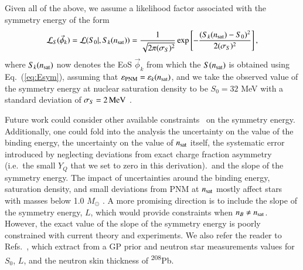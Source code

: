 \documentclass[aps,prd,nofootinbib,tightenlines,notitlepage,floatfix,superscriptaddress,showkeys,twocolumn]{revtex4-1}
\newcommand{\MeV}{\, {\rm MeV}}
\begin{document}
Given all of the above, we assume a likelihood factor associated with the symmetry energy of the form 
\begin{equation}
    \mathcal{L}_S(\vec{\phi}_k) = \mathcal{L}(S_0 |, S_k (n_{\rm sat})) = \dfrac{1}{\sqrt{2\pi(\sigma_S)^2}}\exp\left[-{\dfrac{( S_k(n_{\rm sat}) - S_0)^2}{2(\sigma_S)^2}}\right],
\end{equation}
where $S_k(n_{\rm sat})$ now denotes the EoS $\vec{\phi}_k$ from which the $S(n_{\rm sat})$ is obtained using Eq.~(\ref{eq:Esym}), assuming that $\varepsilon_{\rm PNM} = \varepsilon_k(n_{\rm sat})$, and we take the observed value of the symmetry energy at nuclear saturation density to be $S_0 = 32$ MeV with a standard deviation of $\sigma_S = 2 \MeV$ \cite{Tsang:2012se,Li:2019xxz}. 

Future work could consider other available constraints~\cite{Li:2019xxz,Drischler:2020hwi} on the symmetry energy. Additionally, one could fold into the analysis the uncertainty on the value of the binding energy, the uncertainty on the value of $n_{\rm sat}$ itself, the systematic error introduced by neglecting deviations from exact charge fraction asymmetry (i.e.~the small $Y_Q$ that we set to zero in this derivation).\, and the slope of the symmetry energy. The impact of uncertainties around the binding energy, saturation density, and small deviations from PNM at $n_{\rm sat}$ mostly affect stars with masses below 1.0 $M_\odot$ \cite{Miller:2019nzo}. A more promising direction is to include the slope of the symmetry energy, $L$, which would provide constraints when $n_B\neq n_{\rm sat}$. However, the exact value of the slope of the symmetry energy is poorly constrained with current theory and experiments. We also refer the reader to Refs.~\cite{Essick:2021ezp,Essick:2021kjb}, which extract from a GP prior and neutron star measurements values for $S_0$, $L$, and the neutron skin thickness of \textsuperscript{208}Pb.
\end{document}
